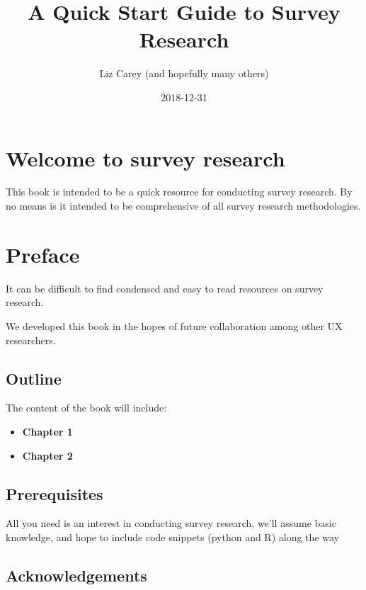 \documentclass[]{book}
\title{A Quick Start Guide to Survey Research}
\author{Liz Carey (and hopefully many others)}
\date{2018-12-31}
\providecommand{\tightlist}{%
  \setlength{\itemsep}{0pt}\setlength{\parskip}{0pt}}
\begin{document}
\maketitle

{
\setcounter{tocdepth}{1}
\tableofcontents
}
\hypertarget{welcome-to-survey-research}{%
\chapter*{Welcome to survey research}\label{welcome-to-survey-research}}

This book is intended to be a quick resource for conducting survey research. By no means is it intended to be comprehensive of all survey research methodologies.

\hypertarget{preface}{%
\chapter*{Preface}\label{preface}}

It can be difficult to find condensed and easy to read resources on survey research.

We developed this book in the hopes of future collaboration among other UX researchers.

\hypertarget{outline}{%
\section*{Outline}\label{outline}}

The content of the book will include:

\begin{itemize}
\tightlist
\item
  \textbf{Chapter 1}
\item
  \textbf{Chapter 2}
\end{itemize}

\hypertarget{prerequisites}{%
\section*{Prerequisites}\label{prerequisites}}

All you need is an interest in conducting survey research, we'll assume basic knowledge, and hope to include code snippets (python and R) along the way

\hypertarget{acknowledgements}{%
\section*{Acknowledgements}\label{acknowledgements}}
\end{document}
